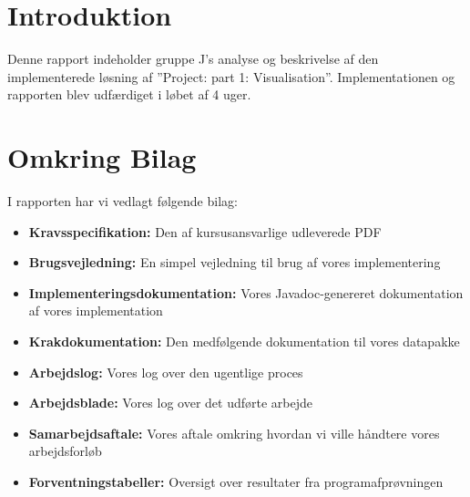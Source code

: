 \section{Introduktion}
Denne rapport indeholder gruppe J's analyse og beskrivelse af den implementerede løsning af ''Project: part 1: Visualisation''. Implementationen og rapporten blev udfærdiget i løbet af 4 uger.
\section{Omkring Bilag}
I rapporten har vi vedlagt følgende bilag:
\begin{itemize}
	\item{\textbf{Kravsspecifikation:} Den af kursusansvarlige udleverede PDF}
	\item{\textbf{Brugsvejledning:} En simpel vejledning til brug af vores implementering}
	\item{\textbf{Implementeringsdokumentation:} Vores Javadoc-genereret dokumentation af vores implementation}
	\item{\textbf{Krakdokumentation:} Den medfølgende dokumentation til vores datapakke}
	\item{\textbf{Arbejdslog:} Vores log over den ugentlige proces}
	\item{\textbf{Arbejdsblade:} Vores log over det udførte arbejde}
	\item{\textbf{Samarbejdsaftale:} Vores aftale omkring hvordan vi ville håndtere vores arbejdsforløb}
	\item{\textbf{Forventningstabeller:} Oversigt over resultater fra programafprøvningen}
\end{itemize}

